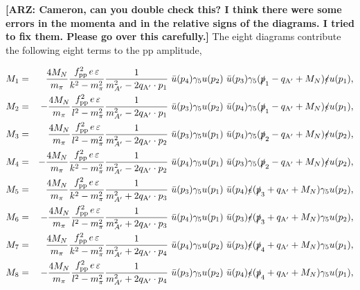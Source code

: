\documentclass[nofootinbib,prd,superscriptaddress,twocolumn]{revtex4}
\newcommand{\qa}{q_{\mathrm{A}'}}
\newcommand{\arz}[1]{{{\bf{\color{BrickRed}[ARZ: #1]}}}}
\begin{document}
\arz{Cameron, can you double check this? I think there were some errors in the momenta and in the relative 
signs of the diagrams. I tried to fix them. Please go over this carefully.}
The eight diagrams contribute the following eight terms to the pp amplitude, 
%
\begin{widetext}
\begin{eqnarray}
	M_1 &=& \frac{4 M_N}{ m_\pi} \frac{f_{\mathrm{pp}}^2\, e\, \varepsilon}{k^2-m_\pi^2}  \frac{1}{m_{A^\prime}^2 - 2 \qa \cdot p_1}\ 
	\bar{u}(p_4) \gamma_5 u(p_2)\  \bar{u}(p_3) \gamma_5 (\slashed{p}_1 - \qa +M_N)\slashed \epsilon  u(p_1), \\
	M_2 &=& -\frac{4 M_N}{ m_\pi} \frac{f_{\mathrm{pp}}^2\, e\, \varepsilon}{l^2-m_\pi^2}  \frac{1}{m_{A^\prime}^2 - 2 \qa \cdot p_1}\  
	\bar{u}(p_3) \gamma_5 u(p_2)\  \bar{u}(p_4) \gamma_5 (\slashed{p}_1 - \qa +M_N)\slashed{\epsilon} u(p_1),\\
	M_3 &=& \frac{4 M_N}{ m_\pi} \frac{f_{\mathrm{pp}}^2\, e\, \varepsilon}{l^2-m_\pi^2}  \frac{1}{m_{A^\prime}^2 - 2 \qa \cdot p_2}\ 
	\bar{u}(p_3) \gamma_5 u(p_1)\ \bar{u}(p_4) \gamma_5 (\slashed{p}_2 - \qa +M_N)\slashed \epsilon  u(p_2), \\
	M_4 &=& -\frac{4 M_N}{ m_\pi} \frac{f_{\mathrm{pp}}^2\, e\, \varepsilon}{k^2-m_\pi^2}  \frac{1}{m_{A^\prime}^2 - 2 \qa \cdot p_2}\ 
	\bar{u}(p_4) \gamma_5 u(p_1)\ \bar{u}(p_3) \gamma_5 (\slashed{p}_2 - \qa +M_N)\slashed \epsilon  u(p_2), \\
	M_5 &=& \frac{4 M_N}{ m_\pi} \frac{f_{\mathrm{pp}}^2\, e\, \varepsilon}{k^2-m_\pi^2}  \frac{1}{m_{A^\prime}^2 + 2 \qa \cdot p_3}\
	\bar{u}(p_3) \gamma_5 u(p_1)\ \bar{u}(p_4) \slashed{\epsilon} (\slashed{p}_3 + \qa +M_N)\gamma_5 u(p_2),\\
	M_6 &=& -\frac{4 M_N}{ m_\pi} \frac{f_{\mathrm{pp}}^2\, e\, \varepsilon}{l^2-m_\pi^2}  \frac{1}{m_{A^\prime}^2 + 2 \qa \cdot p_3}\ 
	\bar{u}(p_4) \gamma_5 u(p_1)\ \bar{u}(p_3) \slashed{\epsilon} (\slashed{p}_3 + \qa +M_N)\gamma_5 u(p_2),\\
	M_7 &=& \frac{4 M_N}{ m_\pi} \frac{f_{\mathrm{pp}}^2\, e\, \varepsilon}{k^2-m_\pi^2}  \frac{1}{m_{A^\prime}^2 + 2 \qa \cdot p_4}\ 
	\bar{u}(p_4) \gamma_5 u(p_2)\ \bar{u}(p_3) \slashed{\epsilon} (\slashed{p}_4 + \qa +M_N)\gamma_5 u(p_1),\\
	M_8 &=& -\frac{4 M_N}{ m_\pi} \frac{f_{\mathrm{pp}}^2\, e\, \varepsilon}{l^2-m_\pi^2}  \frac{1}{m_{A^\prime}^2 + 2 \qa \cdot p_4}\ 
	\bar{u}(p_3) \gamma_5 u(p_2)\ \bar{u}(p_4) \slashed{\epsilon} (\slashed{p}_4 + \qa +M_N)\gamma_5 u(p_1),
\end{eqnarray}
\end{widetext}
\end{document}

